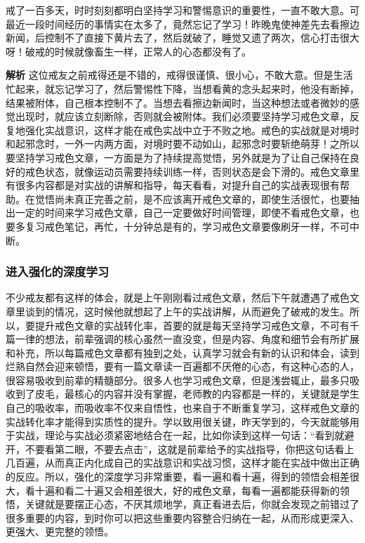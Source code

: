 \begin{case}
    戒了一百多天，时时刻刻都明白坚持学习和警惕意识的重要性，一直不敢大意。可最近一段时间经历的事情实在太多了，竟然忘记了学习！昨晚鬼使神差先去看擦边新闻，后控制不了直接下黄片去了，然后就破了，睡觉又遗了两次，信心打击很大呀！破戒的时候就像畜生一样，正常人的心态都没有了。

    \textbf{解析} 这位戒友之前戒得还是不错的，戒得很谨慎、很小心，不敢大意。但是生活忙起来，就忘记学习了，然后警惕性下降，当想看黄的念头起来时，他没有断掉，结果被附体，自己根本控制不了。当想去看擦边新闻时，当这种想法或者微妙的感觉出现时，就应该立刻断除，否则就会被附体。我们必须要坚持学习戒色文章，反复地强化实战意识，这样才能在戒色实战中立于不败之地。戒色的实战就是对境时和起邪念时，一外一内两方面，对境时要不动如山，起邪念时要斩绝萌芽！之所以要坚持学习戒色文章，一方面是为了持续提高觉悟，另外就是为了让自己保持在良好的戒色状态，就像运动员需要持续训练一样，否则状态是会下滑的。戒色文章里有很多内容都是对实战的讲解和指导，每天看看，对提升自己的实战表现很有帮助。在觉悟尚未真正完善之前，是不应该离开戒色文章的，即使生活很忙，也要抽出一定的时间来学习戒色文章，自己一定要做好时间管理，即使不看戒色文章，也要多复习戒色笔记，再忙，十分钟总是有的，学习戒色文章要像刷牙一样，不可中断。
\end{case}

\subsubsection{进入强化的深度学习}

不少戒友都有这样的体会，就是上午刚刚看过戒色文章，然后下午就遭遇了戒色文章里谈到的情况，这时候他就想起了上午的实战讲解，从而避免了破戒的发生。所以，要提升戒色文章的实战转化率，首要的就是每天坚持学习戒色文章，不可有千篇一律的想法，前辈强调的核心虽然一直没变，但是内容、角度和细节会有所扩展和补充，所以每篇戒色文章都有独到之处，认真学习就会有新的认识和体会，读到烂熟自然会迎来顿悟，要有一篇文章读一百遍都不厌倦的心态，有这种心态的人，很容易吸收到前辈的精髓部分。很多人也学习戒色文章，但是浅尝辄止，最多只吸收到了皮毛，最核心的内容并没有掌握，老师教的内容都是一样的，关键就是学生自己的吸收率，而吸收率不仅来自悟性，也来自于不断重复学习，这样戒色文章的实战转化率才能得到实质性的提升。学以致用很关键，昨天学到的，今天就能够用于实战，理论与实战必须紧密地结合在一起，比如你读到这样一句话：“看到就避开，不要看第二眼，不要去点击”，这就是前辈给予的实战指导，你把这句话看上几百遍，从而真正内化成自己的实战意识和实战习惯，这样才能在实战中做出正确的反应。所以，强化的深度学习非常重要，看一遍和看十遍，得到的领悟会相差很大，看十遍和看二十遍又会相差很大，好的戒色文章，每看一遍都能获得新的领悟，关键就是要摆正心态，不厌其烦地学，真正看进去后，你就会发现之前错过了很多重要的内容，到时你可以把这些重要内容整合归纳在一起，从而形成更深入、更强大、更完整的领悟。


